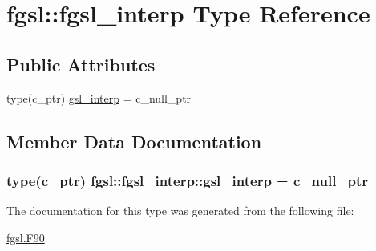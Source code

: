 \hypertarget{structfgsl_1_1fgsl__interp}{}\section{fgsl\+:\+:fgsl\+\_\+interp Type Reference}
\label{structfgsl_1_1fgsl__interp}
\subsection*{Public Attributes}
\begin{DoxyCompactItemize}
\item 
type(c\+\_\+ptr) \hyperlink{structfgsl_1_1fgsl__interp_a7f2707585c89f00e8c9964634ecf9d40}{gsl\+\_\+interp} = c\+\_\+null\+\_\+ptr
\end{DoxyCompactItemize}


\subsection{Member Data Documentation}
\hypertarget{structfgsl_1_1fgsl__interp_a7f2707585c89f00e8c9964634ecf9d40}{}
\subsubsection[{gsl\+\_\+interp}]{\setlength{\rightskip}{0pt plus 5cm}type(c\+\_\+ptr) fgsl\+::fgsl\+\_\+interp\+::gsl\+\_\+interp = c\+\_\+null\+\_\+ptr}\label{structfgsl_1_1fgsl__interp_a7f2707585c89f00e8c9964634ecf9d40}


The documentation for this type was generated from the following file\+:\begin{DoxyCompactItemize}
\item 
\hyperlink{fgsl_8F90}{fgsl.\+F90}\end{DoxyCompactItemize}
